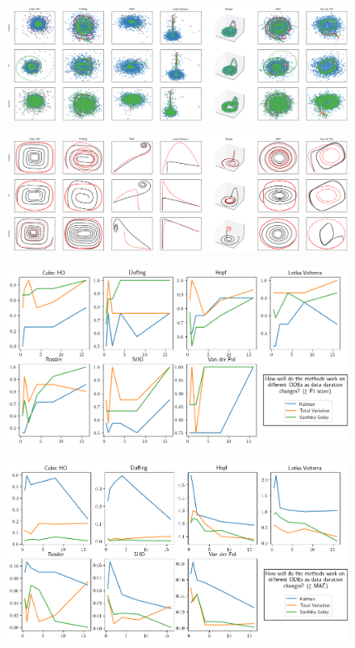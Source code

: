 \documentclass{article}
\begin{document}
\begin{figure}
    \includegraphics[height=\pdfpageheight]{images/summary_train}
\end{figure}
\begin{figure}
    \includegraphics[height=\pdfpageheight]{images/summary_test}
\end{figure}
\begin{figure}
    \includegraphics[width=\textwidth]{images/summary_f1}
\end{figure}
\begin{figure}
    \includegraphics[width=\textwidth]{images/summary_mae}
\end{figure}
\end{document}
